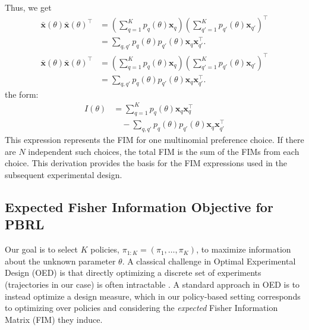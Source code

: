 \documentclass{article}
\begin{document}
Thus, we get\begin{align*}
\bar{\mathbf{x}}(\theta)\bar{\mathbf{x}}(\theta)^\top
&= \left(\sum_{q=1}^K p_q(\theta) \mathbf{x}_q\right)
   \left(\sum_{q'=1}^K p_{q'}(\theta) \mathbf{x}_{q'}\right)^\top \\
&= \sum_{q,q'} p_q(\theta) p_{q'}(\theta) \mathbf{x}_q \mathbf{x}_{q'}^\top.
\end{align*}\begin{align*}
\bar{\mathbf{x}}(\theta)\bar{\mathbf{x}}(\theta)^\top
&= \left(\sum_{q=1}^K p_q(\theta) \mathbf{x}_q\right)
   \left(\sum_{q'=1}^K p_{q'}(\theta) \mathbf{x}_{q'}\right)^\top \\
&= \sum_{q,q'} p_q(\theta) p_{q'}(\theta) \mathbf{x}_q \mathbf{x}_{q'}^\top.
\end{align*} the form:
\begin{align*}
I(\theta) &= \sum_{q=1}^K p_q(\theta) \mathbf{x}_q \mathbf{x}_q^\top \\
&\quad - \sum_{q,q'} p_q(\theta) p_{q'}(\theta) \mathbf{x}_q \mathbf{x}_{q'}^\top
\end{align*}
This expression represents the FIM for one multinomial preference choice. If there are $N$ independent such choices, the total FIM is the sum of the FIMs from each choice. This derivation provides the basis for the FIM expressions used in the subsequent experimental design.


\subsection{Expected Fisher Information Objective for PBRL}
\label{sec:appendix_expected_fim_objective_pbrl}

Our goal is to select $K$ policies, $\pi_{1:K} = (\pi_1, \dots, \pi_K)$, to maximize information about the unknown parameter $\theta$. A classical challenge in Optimal Experimental Design (OED) is that directly optimizing a discrete set of experiments (trajectories in our case) is often intractable \cite{doi:10.1137/1.9780898719109, fedorov1997model}. A standard approach in OED is to instead optimize a design measure, which in our policy-based setting corresponds to optimizing over policies and considering the \textit{expected} Fisher Information Matrix (FIM) they induce.
\end{document}

